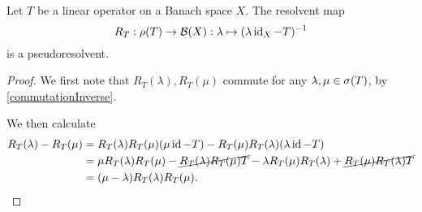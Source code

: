 \begin{proposition}
Let $T$ be a linear operator on a Banach space $X$. The resolvent map
\[ R_T: \rho(T)\to \operatorname{\mathcal{B}}(X): \lambda \mapsto (\lambda\operatorname{id}_X - T)^{-1} \]
is a pseudoresolvent.
\end{proposition}
\begin{proof}
We first note that $R_T(\lambda), R_T(\mu)$ commute for any $\lambda,\mu\in\sigma(T)$, by \ref{commutationInverse}.

We then calculate
\begin{align*}
R_T(\lambda) - R_T(\mu) &= R_T(\lambda)R_T(\mu)(\mu\operatorname{id} - T) - R_T(\mu)R_T(\lambda)(\lambda\operatorname{id} - T) \\
&= \mu R_T(\lambda)R_T(\mu) - \cancel{R_T(\lambda)R_T(\mu) T} - \lambda R_T(\mu)R_T(\lambda) + \cancel{R_T(\mu)R_T(\lambda) T} \\
&= (\mu - \lambda)R_T(\lambda)R_T(\mu).
\end{align*}
\end{proof}

